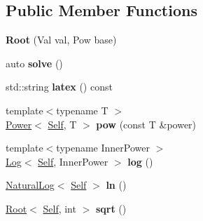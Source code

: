 \subsection*{Public Member Functions}
\begin{DoxyCompactItemize}
\item 
\hypertarget{classlatex_1_1math_1_1Root_ae516f2348dddfd58e8327bf735b9b688}{{\bfseries Root} (Val val, Pow base)}\label{classlatex_1_1math_1_1Root_ae516f2348dddfd58e8327bf735b9b688}

\item 
\hypertarget{classlatex_1_1math_1_1Root_a97fe8f491bf5c90605d6f6aed7073a3a}{auto {\bfseries solve} ()}\label{classlatex_1_1math_1_1Root_a97fe8f491bf5c90605d6f6aed7073a3a}

\item 
\hypertarget{classlatex_1_1math_1_1Root_a7c2119b0146924a8388cbeaa72c4894d}{std\-::string {\bfseries latex} () const }\label{classlatex_1_1math_1_1Root_a7c2119b0146924a8388cbeaa72c4894d}

\item 
\hypertarget{classlatex_1_1math_1_1Root_aa97a93e8ac4719027d863a0a8b40ae93}{{\footnotesize template$<$typename T $>$ }\\\hyperlink{classlatex_1_1math_1_1Power}{Power}$<$ \hyperlink{classlatex_1_1math_1_1Root}{Self}, T $>$ {\bfseries pow} (const T \&power)}\label{classlatex_1_1math_1_1Root_aa97a93e8ac4719027d863a0a8b40ae93}

\item 
\hypertarget{classlatex_1_1math_1_1Root_aa278a24731fa57ed7e4d0615998398a0}{{\footnotesize template$<$typename Inner\-Power $>$ }\\\hyperlink{classlatex_1_1math_1_1Log}{Log}$<$ \hyperlink{classlatex_1_1math_1_1Root}{Self}, Inner\-Power $>$ {\bfseries log} ()}\label{classlatex_1_1math_1_1Root_aa278a24731fa57ed7e4d0615998398a0}

\item 
\hypertarget{classlatex_1_1math_1_1Root_aff88b4d579979681a8794881aab0646c}{\hyperlink{classlatex_1_1math_1_1NaturalLog}{Natural\-Log}$<$ \hyperlink{classlatex_1_1math_1_1Root}{Self} $>$ {\bfseries ln} ()}\label{classlatex_1_1math_1_1Root_aff88b4d579979681a8794881aab0646c}

\item 
\hypertarget{classlatex_1_1math_1_1Root_ab924cd8aa34a6284bd6b7b44610ec088}{\hyperlink{classlatex_1_1math_1_1Root}{Root}$<$ \hyperlink{classlatex_1_1math_1_1Root}{Self}, int $>$ {\bfseries sqrt} ()}\label{classlatex_1_1math_1_1Root_ab924cd8aa34a6284bd6b7b44610ec088}

\end{DoxyCompactItemize}
